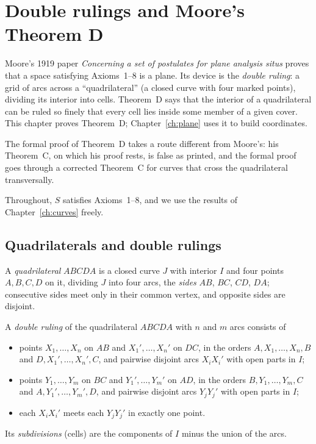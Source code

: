 \chapter{Double rulings and Moore's Theorem D}\label{ch:rulings}

Moore's 1919 paper \emph{Concerning a set of postulates for plane analysis situs} proves that a space
satisfying Axioms~1--8 is a plane. Its device is the \emph{double ruling}: a grid of arcs across a
``quadrilateral'' (a closed curve with four marked points), dividing its interior into cells. Theorem~D says
that the interior of a quadrilateral can be ruled so finely that every cell lies inside some member of a given
cover. This chapter proves Theorem~D; Chapter~\ref{ch:plane} uses it to build coordinates.

The formal proof of Theorem~D takes a route different from Moore's: his Theorem~C, on which his proof rests, is
false as printed, and the formal proof goes through a corrected Theorem~C for curves that cross the quadrilateral
transversally.

Throughout, $S$ satisfies Axioms~1--8, and we use the results of Chapter~\ref{ch:curves} freely.

\section{Quadrilaterals and double rulings}

\begin{definition}\label{def:quad}
A \emph{quadrilateral} $ABCDA$ is a closed curve $J$ with interior $I$ and four points $A,B,C,D$ on it,
dividing $J$ into four arcs, the \emph{sides} $AB$, $BC$, $CD$, $DA$; consecutive sides meet only in their
common vertex, and opposite sides are disjoint.
\end{definition}


\begin{definition}\label{def:double-ruling}
A \emph{double ruling} of the quadrilateral $ABCDA$ with $n$ and $m$ arcs consists of
\begin{itemize}
\item points $X_1,\dots,X_n$ on $AB$ and $X_1',\dots,X_n'$ on $DC$, in the orders $A,X_1,\dots,X_n,B$ and
$D,X_1',\dots,X_n',C$, and pairwise disjoint arcs $X_iX_i'$ with open parts in $I$;
\item points $Y_1,\dots,Y_m$ on $BC$ and $Y_1',\dots,Y_m'$ on $AD$, in the orders $B,Y_1,\dots,Y_m,C$ and
$A,Y_1',\dots,Y_m',D$, and pairwise disjoint arcs $Y_jY_j'$ with open parts in $I$;
\item each $X_iX_i'$ meets each $Y_jY_j'$ in exactly one point.
\end{itemize}
Its \emph{subdivisions} (cells) are the components of $I$ minus the union of the arcs.
\end{definition}

